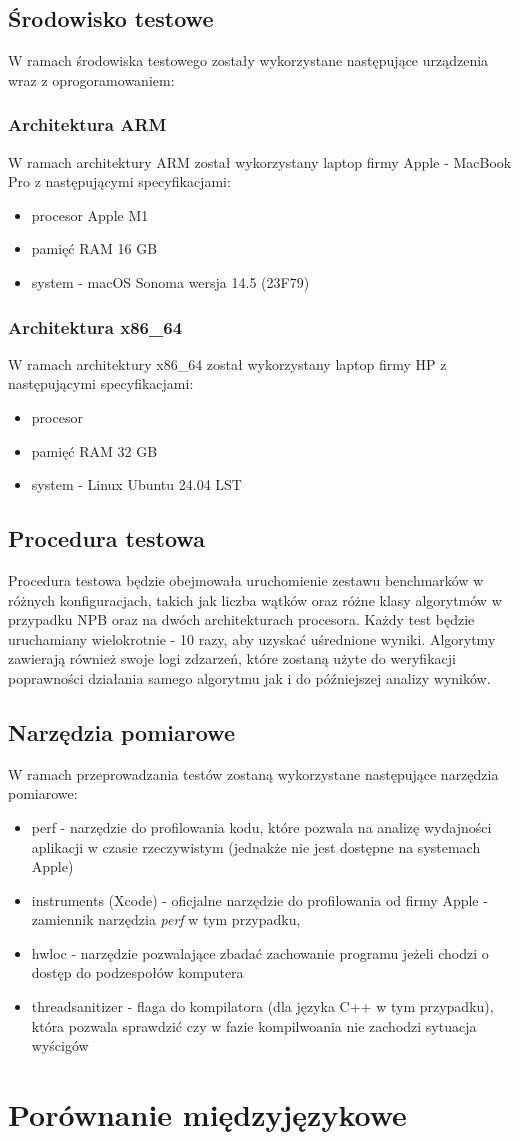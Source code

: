 \subsection{Środowisko testowe}
W ramach środowiska testowego zostały wykorzystane następujące urządzenia wraz z oprogoramowaniem:
\subsubsection{Architektura ARM}
W ramach architektury ARM został wykorzystany laptop firmy Apple - MacBook Pro z następującymi specyfikacjami:
\begin{itemize}
    \item procesor Apple M1
    \item pamięć RAM 16 GB
    \item system - macOS Sonoma wersja 14.5 (23F79)
\end{itemize}
\subsubsection{Architektura x86\_64}
W ramach architektury x86\_64 został wykorzystany laptop firmy HP z następującymi specyfikacjami:
\begin{itemize}
    \item procesor
    \item pamięć RAM 32 GB
    \item system - Linux Ubuntu 24.04 LST
\end{itemize}
\subsection{Procedura testowa}
Procedura testowa będzie obejmowała uruchomienie zestawu benchmarków w różnych konfiguracjach, takich jak liczba wątków oraz różne klasy algorytmów w przypadku NPB oraz na dwóch architekturach procesora. Każdy test będzie uruchamiany wielokrotnie - 10 razy, aby uzyskać uśrednione wyniki. Algorytmy zawierają również swoje logi zdzarzeń, które zostaną użyte do weryfikacji poprawności działania samego algorytmu jak i do późniejszej analizy wyników.
\subsection{Narzędzia pomiarowe}
W ramach przeprowadzania testów zostaną wykorzystane następujące narzędzia pomiarowe:
\begin{itemize}
    \item perf - narzędzie do profilowania kodu, które pozwala na analizę wydajności aplikacji w czasie rzeczywistym (jednakże nie jest dostępne na systemach Apple)
    \item instruments (Xcode) - oficjalne narzędzie do profilowania od firmy Apple - zamiennik narzędzia \textit{perf} w tym przypadku,
    \item hwloc - narzędzie pozwalające zbadać zachowanie programu jeżeli chodzi o dostęp do podzespołów komputera
    \item threadsanitizer - flaga do kompilatora (dla języka C++ w tym przypadku), która pozwala sprawdzić czy w fazie kompilwoania nie zachodzi sytuacja wyścigów
\end{itemize}

\section{Porównanie międzyjęzykowe}

